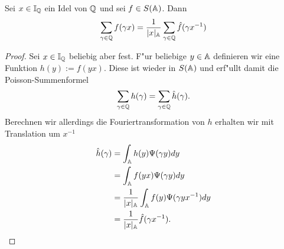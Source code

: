 	\begin{satz}
		Sei $x \in \mathbb{I}_{\mathbb{Q}}$ ein Idel von $\mathbb{Q}$ und sei $f\in S(\mathbb{A})$. Dann
		\begin{align*}
			\sum_{\gamma \in \mathbb{Q}} {f(\gamma x)} = \frac{1}{|x|_{\mathbb{A}}}\sum_{\gamma \in \mathbb{Q}} {\hat{f}(\gamma x^{-1})}
		\end{align*}
	\end{satz}
	\begin{proof}
	Sei $x \in \mathbb{I}_{\mathbb{Q}}$ beliebig aber fest. F"ur beliebige $y \in \mathbb{A}$ definieren wir eine Funktion $h(y):=f(yx)$. Diese ist wieder in $S(\mathbb{A})$ und erf"ullt damit die Poisson-Summenformel
		\begin{align*}
			\sum_{\gamma \in \mathbb{Q}}h(\gamma) = \sum_{\gamma \in \mathbb{Q}} \hat{h}(\gamma).
		\end{align*}
		Berechnen wir allerdings die Fouriertransformation von $h$ erhalten wir mit Translation um $x^{-1}$
		\begin{align*}
			\hat{h}(\gamma) &= \int_{\mathbb{A}}h(y)\Psi(\gamma y)dy \\
							 &= \int_{\mathbb{A}}f(yx)\Psi(\gamma y)dy \\
							 &= \frac{1}{|x|_{\mathbb{A}}} \int_{\mathbb{A}}f(y)\Psi(\gamma y x^{-1})dy \\
							 &= \frac{1}{|x|_{\mathbb{A}}} \hat{f}(\gamma x^{-1}).
		\end{align*}
	\end{proof}
